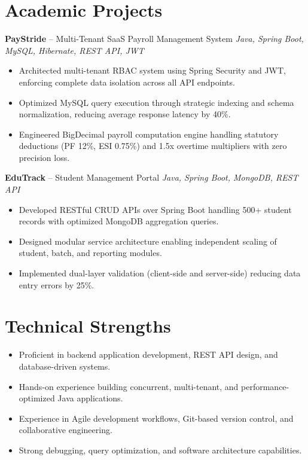 \documentclass[10.5pt,a4paper]{article}
\begin{document}
\section{Academic Projects}
\textbf{PayStride} -- Multi-Tenant SaaS Payroll Management System \hfill \textit{Java, Spring Boot, MySQL, Hibernate, REST API, JWT}
\begin{itemize}
  \item Architected multi-tenant RBAC system using Spring Security and JWT, enforcing complete data isolation across all API endpoints.
  \item Optimized MySQL query execution through strategic indexing and schema normalization, reducing average response latency by 40\%.
  \item Engineered BigDecimal payroll computation engine handling statutory deductions (PF 12\%, ESI 0.75\%) and 1.5x overtime multipliers with zero precision loss.
\end{itemize}
\vspace{2pt}
\textbf{EduTrack} -- Student Management Portal \hfill \textit{Java, Spring Boot, MongoDB, REST API}
\begin{itemize}
  \item Developed RESTful CRUD APIs over Spring Boot handling 500+ student records with optimized MongoDB aggregation queries.
  \item Designed modular service architecture enabling independent scaling of student, batch, and reporting modules.
  \item Implemented dual-layer validation (client-side and server-side) reducing data entry errors by 25\%.
\end{itemize}
\section{Technical Strengths}
\begin{itemize}
  \item Proficient in backend application development, REST API design, and database-driven systems.
  \item Hands-on experience building concurrent, multi-tenant, and performance-optimized Java applications.
  \item Experience in Agile development workflows, Git-based version control, and collaborative engineering.
  \item Strong debugging, query optimization, and software architecture capabilities.
\end{itemize}
\end{document}
